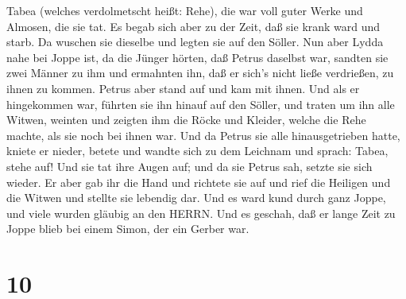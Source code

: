 Tabea (welches verdolmetscht heißt: Rehe), die war voll guter Werke und
Almosen, die sie tat.  Es begab sich aber zu der Zeit, daß
sie krank ward und starb. Da wuschen sie dieselbe und legten sie auf den
Söller.  Nun aber Lydda nahe bei Joppe ist, da die Jünger
hörten, daß Petrus daselbst war, sandten sie zwei Männer zu ihm und
ermahnten ihn, daß er sich's nicht ließe verdrießen, zu ihnen zu kommen.
 Petrus aber stand auf und kam mit ihnen. Und als er
hingekommen war, führten sie ihn hinauf auf den Söller, und traten um
ihn alle Witwen, weinten und zeigten ihm die Röcke und Kleider, welche
die Rehe machte, als sie noch bei ihnen war.  Und da Petrus
sie alle hinausgetrieben hatte, kniete er nieder, betete und wandte sich
zu dem Leichnam und sprach: Tabea, stehe auf! Und sie tat ihre Augen
auf; und da sie Petrus sah, setzte sie sich wieder.  Er
aber gab ihr die Hand und richtete sie auf und rief die Heiligen und die
Witwen und stellte sie lebendig dar.  Und es ward kund
durch ganz Joppe, und viele wurden gläubig an den HERRN. 
Und es geschah, daß er lange Zeit zu Joppe blieb bei einem Simon, der
ein Gerber war.

\hypertarget{section-9}{%
\section{10}\label{section-9}}

